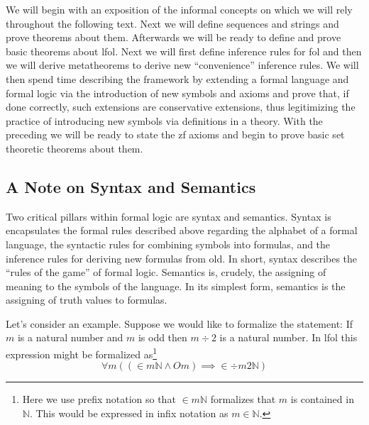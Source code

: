 \documentclass[12pt]{article}
\theoremstyle{break}
\theoremstyle{break}
\theoremstyle{break}
\theoremstyle{break}
\theoremstyle{break}
\newtheorem{informal definition}[definition]{Informal Definition}
\theoremstyle{break}
\newtheorem{informal theorem}[theorem]{Informal Theorem}
\newcommand{\qq}[1]{``#1''}
\begin{document}
We will begin with an exposition of the informal concepts on which we will rely throughout the following text.
Next we will define sequences and strings and prove theorems about them.
Afterwards we will be ready to define and prove basic theorems about \gls{lfol}.
Next we will first define inference rules for \gls{fol} and then we will derive metatheorems to derive new \qq{convenience} inference rules.
We will then spend time describing the framework by extending a formal language and formal logic via the introduction of new symbols and axioms and prove that, if done correctly, such extensions are conservative extensions, thus legitimizing the practice of introducing new symbols via definitions in a theory.
With the preceding we will be ready to state the \gls{zf} axioms and begin to prove basic set theoretic theorems about them.


\subsection{A Note on Syntax and Semantics}

Two critical pillars within formal logic are syntax and semantics.
Syntax is encapsulates the formal rules described above regarding the alphabet of a formal language, the syntactic rules for combining symbols into formulas, and the inference rules for deriving new formulas from old.
In short, syntax describes the \qq{rules of the game} of formal logic.
Semantics is, crudely, the assigning of meaning to the symbols of the language.
In its simplest form, semantics is the assigning of truth values to formulas.

Let's consider an example.
Suppose we would like to formalize the statement: If $m$ is a natural number and $m$ is odd then $m \div 2$ is a natural number.
In \gls{lfol} this expression might be formalized as\footnote{Here we use prefix notation so that $\in m \mathbb{N}$ formalizes that $m$ is contained in $\mathbb{N}$. This would be expressed in infix notation as $m\in \mathbb{N}$.}
\begin{equation*}
\forall m((\in m \mathbb{N} \land Om) \implies \in \div m 2 \mathbb{N})
\end{equation*}
\end{document}
